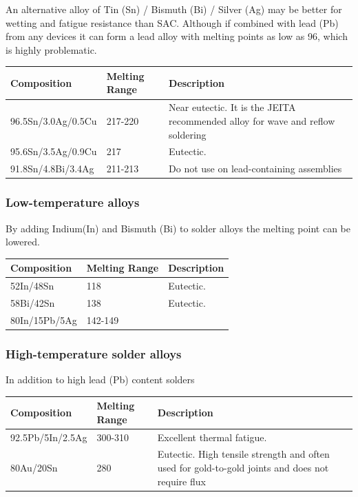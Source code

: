 \documentclass{article}
\begin{document}
		An alternative alloy of Tin (Sn) / Bismuth (Bi) / Silver (Ag) may be better for wetting and fatigue resistance than SAC.
		Although if combined with lead (Pb) from any devices it can form a lead alloy with melting points as low as 96\degree , which is highly problematic.
		 \begin{center}
 			\begin{tabular}{| m{10em} | m{5em}| m{17em} |} 
 			\hline
 			\textbf{Composition} & \textbf{Melting Range} & \textbf{Description} \\ [0.5ex] 
 			\hline\hline
 			96.5Sn/3.0Ag/0.5Cu & 217-220\degree & Near eutectic. It is the JEITA recommended alloy for wave and reflow soldering \\ 
 			\hline
 			95.6Sn/3.5Ag/0.9Cu & 217\degree & Eutectic. \\ 
 			\hline
 			91.8Sn/4.8Bi/3.4Ag & 211-213\degree & Do not use on lead-containing assemblies \\
 			\hline
			\end{tabular}
		\end{center}
		
		\subsubsection{Low-temperature alloys}
		By adding Indium(In) and Bismuth (Bi) to solder alloys the melting point can be lowered.
		 \begin{center}
 			\begin{tabular}{| m{10em} | m{5em}| m{17em} |} 
 			\hline
 			\textbf{Composition} & \textbf{Melting Range} & \textbf{Description} \\ [0.5ex] 
 			\hline\hline
 			52In/48Sn & 118\degree & Eutectic. \\ 
 			\hline
 			58Bi/42Sn & 138\degree & Eutectic. \\ 
 			\hline
 			80In/15Pb/5Ag & 142-149\degree &  \\
 			\hline
			\end{tabular}
		\end{center}
		
		\subsubsection{High-temperature solder alloys}
		In addition to high lead (Pb) content solders		
		
		\begin{center}
 			\begin{tabular}{| m{10em} | m{5em}| m{17em} |} 
 			\hline
 			\textbf{Composition} & \textbf{Melting Range} & \textbf{Description} \\ [0.5ex] 
 			\hline
 			92.5Pb/5In/2.5Ag & 300-310\degree & Excellent thermal fatigue. \\ 
 			\hline
 			80Au/20Sn & 280\degree & Eutectic. High tensile strength and often used for gold-to-gold joints and does not require flux \\ 
 			\hline
			\end{tabular}
		\end{center}		
		
\end{document}
